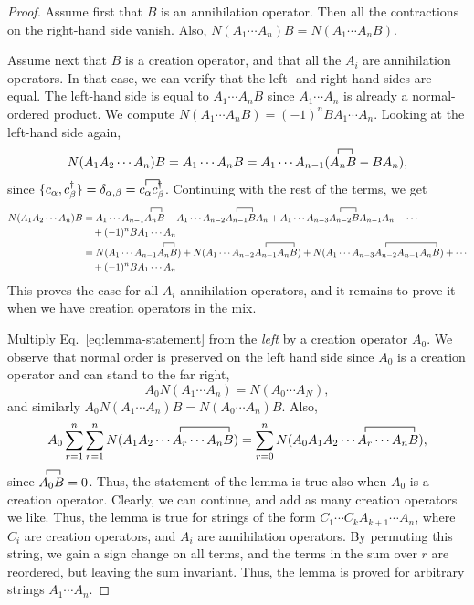 \documentclass{report}
\theoremstyle{plain}
\theoremstyle{definition}
\begin{document}
\begin{proof}
  Assume first that $B$ is an annihilation operator. Then all the
  contractions on the right-hand side vanish. Also, $N(A_1\cdots A_n)B
  = N(A_1\cdots A_n B)$.

  Assume next that $B$ is a creation operator, and that all the $A_i$
  are annihilation operators. In that case, we can verify that the
  left- and right-hand sides are equal. The left-hand side is equal to
  $A_1\cdots A_n B$ since $A_1\cdots A_n$ is already a normal-ordered
  product. We compute $N(A_1\cdots A_n B) = (-1)^n B A_1\cdots
  A_n$. Looking at the left-hand side again,
  \begin{equation}
    N(A_1 A_2\cdots A_n)B = A_1 \cdots A_n B = A_1\cdots A_{n-1}
    (\contraction{}{A_n}{}{B} A_n B - B A_n),
  \end{equation}
  since $\{c_\alpha, c^\dag_\beta\} = \delta_{\alpha,\beta} =
  \contraction{}{c_\alpha}{}{c^\dag_\beta} c_\alpha
  c^\dag_\beta$. Continuing with the rest of the terms, we get
  \begin{equation}\begin{split}
    N(A_1 A_2\cdots A_n)B &= A_1\cdots A_{n-1}
    \contraction{}{A_n}{}{B} A_n B - A_1\cdots A_{n-2}
    \contraction{}{A_{n-1}}{}{B} A_{n-1} B A_n + A_1\cdots A_{n-3}
    \contraction{}{A_{n-2}}{}{B} A_{n-2} B A_{n-1} A_n - \cdots \\
    & \quad +  (-1)^n B A_1 \cdots A_n \\
 &= N(A_1\cdots A_{n-1}
    \contraction{}{A_n}{}{B} A_n B)  + N(A_1\cdots A_{n-2}
    \contraction{}{A_{n-1}}{A_n}{B} A_{n-1}  A_n B) + N(A_1\cdots A_{n-3}
    \contraction{}{A_{n-2}}{A_{n-1} A_n}{B} A_{n-2} A_{n-1} A_n B ) + \cdots \\
    & \quad +  (-1)^n B A_1 \cdots A_n
  \end{split}
\end{equation}
This proves the case for all $A_i$ annihilation operators, and it
remains to prove it when we have creation operators in the mix.

Multiply Eq.~\eqref{eq:lemma-statement} from the \emph{left} by a
creation operator $A_0$. We observe that normal order is preserved on
the left hand side since $A_0$ is a creation operator and can stand to
the far right,
\[ A_0 N(A_1\cdots A_n) = N(A_0 \cdots A_N), \]
and similarly $A_0 N(A_1\cdots A_n ) B = N(A_0\cdots A_n )B$.
Also,
\[ A_0 \sum_{r=1}^n \sum_{r=1}^n N(A_1 A_2 \cdots
  \contraction{}{A_r}{\cdots A_n}{B} A_r \cdots A_n B) = \sum_{r=0}^n
  N(A_0 A_1 A_2 \cdots
  \contraction{}{A_r}{\cdots A_n}{B} A_r \cdots A_n B),\]
since $\contraction{}{A_0}{}{B}A_0 B = 0$. Thus, the statement of the
lemma is true also when $A_0$ is a creation operator. Clearly, we can
continue, and add as many creation operators we like. Thus, the lemma
is true for strings of the form $C_1\cdots C_k A_{k+1}\cdots A_n$,
where $C_i$ are creation operators, and $A_i$ are annihilation
operators. By permuting this string, we gain a sign change on all
terms, and the terms in the sum over $r$ are reordered, but leaving
the sum invariant. Thus, the lemma is proved for arbitrary strings
$A_1\cdots A_n$.  
\end{proof}
\end{document}
